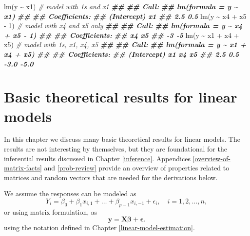 \documentclass[
]{book}
\newenvironment{Shaded}{\begin{snugshade}}{\end{snugshade}}
\newcommand{\CommentTok}[1]{\textcolor[rgb]{0.56,0.35,0.01}{\textit{#1}}}
\newcommand{\DecValTok}[1]{\textcolor[rgb]{0.00,0.00,0.81}{#1}}
\newcommand{\DocumentationTok}[1]{\textcolor[rgb]{0.56,0.35,0.01}{\textbf{\textit{#1}}}}
\newcommand{\FunctionTok}[1]{\textcolor[rgb]{0.00,0.00,0.00}{#1}}
\newcommand{\NormalTok}[1]{#1}
\newcommand{\SpecialCharTok}[1]{\textcolor[rgb]{0.00,0.00,0.00}{#1}}
\theoremstyle{definition}
\theoremstyle{definition}
\theoremstyle{definition}
\theoremstyle{definition}
\theoremstyle{remark}
\begin{document}
\begin{Shaded}
\begin{Highlighting}[]
\FunctionTok{lm}\NormalTok{(y }\SpecialCharTok{\textasciitilde{}}\NormalTok{ x1)           }\CommentTok{\# model with 1s and x1}
\DocumentationTok{\#\# }
\DocumentationTok{\#\# Call:}
\DocumentationTok{\#\# lm(formula = y \textasciitilde{} x1)}
\DocumentationTok{\#\# }
\DocumentationTok{\#\# Coefficients:}
\DocumentationTok{\#\# (Intercept)           x1  }
\DocumentationTok{\#\#         2.5          0.5}
\FunctionTok{lm}\NormalTok{(y }\SpecialCharTok{\textasciitilde{}}\NormalTok{ x4 }\SpecialCharTok{+}\NormalTok{ x5 }\SpecialCharTok{{-}} \DecValTok{1}\NormalTok{)  }\CommentTok{\# model with x4 and x5 only}
\DocumentationTok{\#\# }
\DocumentationTok{\#\# Call:}
\DocumentationTok{\#\# lm(formula = y \textasciitilde{} x4 + x5 {-} 1)}
\DocumentationTok{\#\# }
\DocumentationTok{\#\# Coefficients:}
\DocumentationTok{\#\# x4  x5  }
\DocumentationTok{\#\# {-}3  {-}5}
\FunctionTok{lm}\NormalTok{(y }\SpecialCharTok{\textasciitilde{}}\NormalTok{ x1 }\SpecialCharTok{+}\NormalTok{ x4 }\SpecialCharTok{+}\NormalTok{ x5) }\CommentTok{\# model with 1s, x1, x4, x5}
\DocumentationTok{\#\# }
\DocumentationTok{\#\# Call:}
\DocumentationTok{\#\# lm(formula = y \textasciitilde{} x1 + x4 + x5)}
\DocumentationTok{\#\# }
\DocumentationTok{\#\# Coefficients:}
\DocumentationTok{\#\# (Intercept)           x1           x4           x5  }
\DocumentationTok{\#\#         2.5          0.5         {-}3.0         {-}5.0}
\end{Highlighting}
\end{Shaded}

\hypertarget{linear-model-theory}{%
\chapter{Basic theoretical results for linear models}\label{linear-model-theory}}

In this chapter we discuss many basic theoretical results for linear models. The results are not interesting by themselves, but they are foundational for the inferential results discussed in Chapter \ref{inference}. Appendices \ref{overview-of-matrix-facts} and \ref{prob-review} provide an overview of properties related to matrices and random vectors that are needed for the derivations below.

We assume the responses can be modeled as
\[
Y_i=\beta_0+\beta_1 x_{i,1} +\ldots + \beta_{p-1}x_{i,-1}+\epsilon_i,\quad i=1,2,\ldots,n,
\]
or using matrix formulation, as
\[
\mathbf{y} = \mathbf{X}\boldsymbol{\beta}+\boldsymbol{\epsilon}.\label{eq:linear-model-def-matrix}
\]
using the notation defined in Chapter \ref{linear-model-estimation}.
\end{document}
